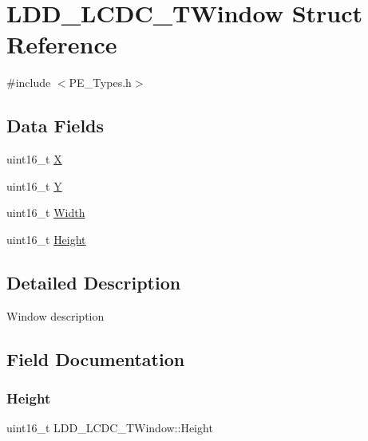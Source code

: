 \hypertarget{struct_l_d_d___l_c_d_c___t_window}{}\section{L\+D\+D\+\_\+\+L\+C\+D\+C\+\_\+\+T\+Window Struct Reference}
\label{struct_l_d_d___l_c_d_c___t_window}


{\ttfamily \#include $<$P\+E\+\_\+\+Types.\+h$>$}

\subsection*{Data Fields}
\begin{DoxyCompactItemize}
\item 
uint16\+\_\+t \hyperlink{struct_l_d_d___l_c_d_c___t_window_a9dd1270e9794b4dbd79b2b30afca87c9}{X}
\item 
uint16\+\_\+t \hyperlink{struct_l_d_d___l_c_d_c___t_window_af64f532d1fb5899c563ba40df90867d8}{Y}
\item 
uint16\+\_\+t \hyperlink{struct_l_d_d___l_c_d_c___t_window_a53ee53813f5884a400be8ca3093233c4}{Width}
\item 
uint16\+\_\+t \hyperlink{struct_l_d_d___l_c_d_c___t_window_abe1dbefb6d43373336fa414b88a79cc2}{Height}
\end{DoxyCompactItemize}


\subsection{Detailed Description}
Window description 

\subsection{Field Documentation}
\mbox{\label{struct_l_d_d___l_c_d_c___t_window_abe1dbefb6d43373336fa414b88a79cc2}} 
\subsubsection{\texorpdfstring{Height}{Height}}
{\footnotesize\ttfamily uint16\+\_\+t L\+D\+D\+\_\+\+L\+C\+D\+C\+\_\+\+T\+Window\+::\+Height}

